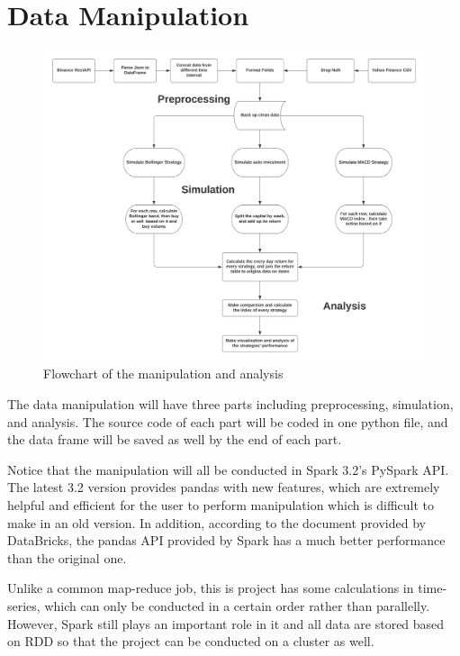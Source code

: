 \documentclass[a4paper]{article}
\begin{document}
\section{Data Manipulation}
\begin{figure}[H]
    \centering
    \includegraphics[scale=0.5]{Flowchart.png}
    \caption{Flowchart of the manipulation and analysis}
\end{figure}
The data manipulation will have three parts including preprocessing, simulation, and analysis. The source code of each part will be coded in one python file, and the data frame will be saved as well by the end of each part. 
\par Notice that the manipulation will all be conducted in Spark 3.2's PySpark API. The latest 3.2 version provides pandas with new features, which are extremely helpful and efficient for the user to perform manipulation which is difficult to make in an old version. In addition, according to the document provided by DataBricks, the pandas API provided by Spark has a much better performance than the original one.
\par Unlike a common map-reduce job, this is project has some calculations in time-series, which can only be conducted in a certain order rather than parallelly. However, Spark still plays an important role in it and all data are stored based on RDD so that the project can be conducted on a cluster as well.
\end{document}
